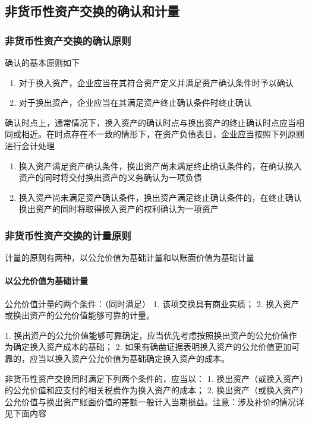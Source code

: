 \documentclass[UTF8,12pt]{ctexart}
\numberwithin{equation}{section} %
\numberwithin{figure}{section}
\numberwithin{table}{section}
\begin{document}
	\subsection{非货币性资产交换的确认和计量}
	\subsubsection{非货币性资产交换的确认原则}
	确认的基本原则如下
	\begin{enumerate}
		\item 对于换入资产，企业应当在其符合资产定义并满足资产确认条件时予以确认
		
		\item 对于换出资产，企业应当在其满足资产终止确认条件时终止确认
	\end{enumerate}
	
	确认时点上，通常情况下，换入资产的确认时点与换出资产的终止确认时点应当相同或相近。在时点存在不一致的情形下，在资产负债表日，企业应当按照下列原则进行会计处理
	\begin{enumerate}
		\item 换入资产满足资产确认条件，换出资产尚未满足终止确认条件的，在确认换入资产的同时将交付换出资产的义务确认为一项负债
		
		\item 换入资产尚未满足资产确认条件，换出资产满足终止确认条件的，在终止确认换出资产的同时将取得换入资产的权利确认为一项资产
	\end{enumerate}
	
	\subsubsection{非货币性资产交换的计量原则}
	计量的原则有两种，以公允价值为基础计量和以账面价值为基础计量
	\paragraph{以公允价值为基础计量}
	公允价值计量的两个条件：（同时满足）
	1.	该项交换具有商业实质；
	2.	换入资产或换出资产的公允价值能够可靠的计量。
	
	1.	换出资产的公允价值能够可靠确定，应当优先考虑按照换出资产的公允价值作为确定换入资产成本的基础；
	2.	如果有确凿证据表明换入资产的公允价值更加可靠的，应当以换入资产公允价值为基础确定换入资产的成本。
	
	非货币性资产交换同时满足下列两个条件的，应当以：
	1.	换出资产（或换入资产）的公允价值和应支付的相关税费作为换入资产的成本；
	2.	换出资产（或换入资产）公允价值与换出资产账面价值的差额一般计入当期损益。注意：涉及补价的情况详见下面内容
	
\end{document}
